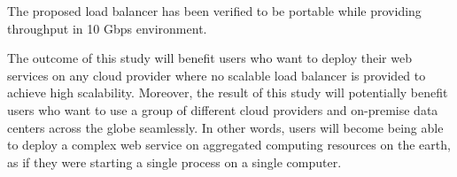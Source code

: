 The proposed load balancer has been verified to be portable while providing   throughput in 10 Gbps environment.

The outcome of this study will benefit users who want to deploy their web services on any cloud provider where no scalable load balancer is provided to achieve high scalability.
Moreover, the result of this study will potentially benefit users who want to use a group of different cloud providers and on-premise data centers across the globe seamlessly.
In other words, users will become being able to deploy a complex web service on aggregated computing resources on the earth, as if they were starting a single process on a single computer.

